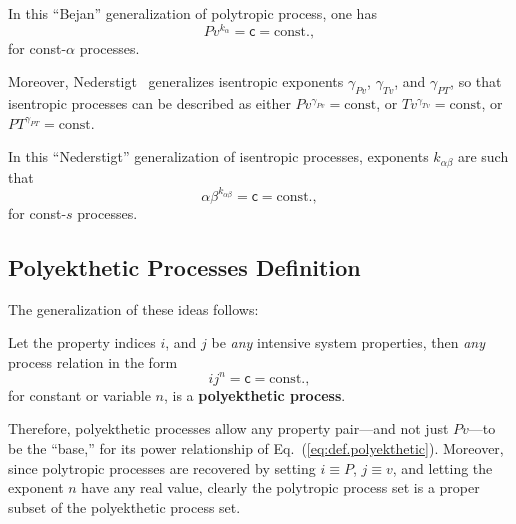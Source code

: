     In this ``Bejan'' generalization of polytropic process, one has
    \begin{equation}
        Pv^{k_{\alpha}} = \mathsf{c} = \mbox{const.},
        \label{eq:gen.Bejan}
    \end{equation}
    \noindent for const-$\alpha$ processes.

    Moreover,  Nederstigt~\cite{2017-NederstigtP-TUDelft}   generalizes   isentropic   exponents
    $\gamma_{Pv}$, $\gamma_{Tv}$,  and  $\gamma_{PT}$,  so  that  isentropic  processes  can  be
    described as either $Pv^{\gamma_{Pv}} = \mbox{const}$, or $Tv^{\gamma_{Tv}} = \mbox{const}$,
    or $PT^{\gamma_{PT}} = \mbox{const}$.

    In this ``Nederstigt'' generalization of isentropic processes,  exponents  $k_{\alpha\beta}$
    are such that
    \begin{equation}
        \alpha\beta^{k_{\alpha\beta}} = \mathsf{c} = \mbox{const.},
        \label{eq:gen.Nederstigt}
    \end{equation}
    \noindent for const-$s$ processes.

    \subsection{Polyekthetic Processes Definition}

    The generalization of these ideas follows:

    \begin{definition}\label{def:polyekthetic}
        Let the property indices $i$, and $j$ be \emph{any} intensive  system  properties,  then
        \emph{any} process relation in the form
        \begin{equation}
            ij^n = \mathsf{c} = \mbox{const.},
            \label{eq:def.polyekthetic}
        \end{equation}
        \noindent for constant or variable $n$, is a \textbf{polyekthetic process}.
    \end{definition}

    Therefore, polyekthetic processes allow any property pair---and not just  $Pv$---to  be  the
    ``base,'' for its power relationship  of  Eq.~(\ref{eq:def.polyekthetic}).  Moreover,  since
    polytropic processes are recovered by setting $i \equiv P$, $j \equiv v$,  and  letting  the
    exponent $n$ have any real value, clearly the polytropic process set is a proper  subset  of
    the polyekthetic process set.


